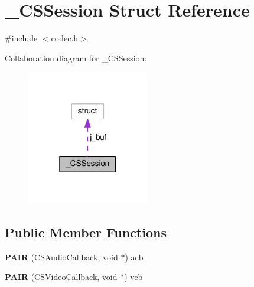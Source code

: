 \hypertarget{struct___c_s_session}{\section{\+\_\+\+C\+S\+Session Struct Reference}
\label{struct___c_s_session}
}


{\ttfamily \#include $<$codec.\+h$>$}



Collaboration diagram for \+\_\+\+C\+S\+Session\+:\nopagebreak
\begin{figure}[H]
\begin{center}
\leavevmode
\includegraphics[width=151pt]{struct___c_s_session__coll__graph}
\end{center}
\end{figure}
\subsection*{Public Member Functions}
\begin{DoxyCompactItemize}
\item 
\hypertarget{struct___c_s_session_a386fcae0e3f3ef0fcd8b2c401a7a25e5}{{\bfseries P\+A\+I\+R} (C\+S\+Audio\+Callback, void $\ast$) acb}\label{struct___c_s_session_a386fcae0e3f3ef0fcd8b2c401a7a25e5}

\item 
\hypertarget{struct___c_s_session_a68cfb40772f235c4c4649ca156cea307}{{\bfseries P\+A\+I\+R} (C\+S\+Video\+Callback, void $\ast$) vcb}\label{struct___c_s_session_a68cfb40772f235c4c4649ca156cea307}

\end{DoxyCompactItemize}
